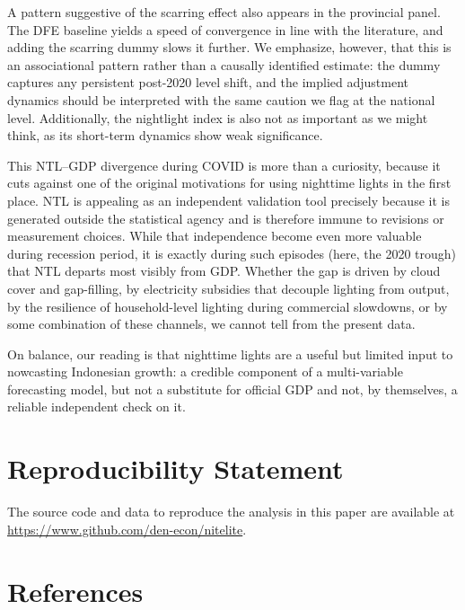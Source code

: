 \documentclass[
  manuscript=article,
  layout=publish,
  year=2026,
  volume=3,
]{den}
\begin{document}
A pattern suggestive of the scarring effect also appears in the
provincial panel. The DFE baseline yields a speed of convergence in line
with the literature, and adding the scarring dummy slows it further. We
emphasize, however, that this is an associational pattern rather than a
causally identified estimate: the dummy captures any persistent
post-2020 level shift, and the implied adjustment dynamics should be
interpreted with the same caution we flag at the national level.
Additionally, the nightlight index is also not as important as we might
think, as its short-term dynamics show weak significance.

This NTL--GDP divergence during COVID is more than a curiosity, because
it cuts against one of the original motivations for using nighttime
lights in the first place. NTL is appealing as an independent validation
tool precisely because it is generated outside the statistical agency
and is therefore immune to revisions or measurement choices. While that
independence become even more valuable during recession period, it is
exactly during such episodes (here, the 2020 trough) that NTL departs
most visibly from GDP. Whether the gap is driven by cloud cover and
gap-filling, by electricity subsidies that decouple lighting from
output, by the resilience of household-level lighting during commercial
slowdowns, or by some combination of these channels, we cannot tell from
the present data.

On balance, our reading is that nighttime lights are a useful but
limited input to nowcasting Indonesian growth: a credible component of a
multi-variable forecasting model, but not a substitute for official GDP
and not, by themselves, a reliable independent check on it.

\section*{Reproducibility Statement}\label{reproducibility-statement}

The source code and data to reproduce the analysis in this paper are
available at \url{https://www.github.com/den-econ/nitelite}.

\section*{References}\label{references}
\end{document}
